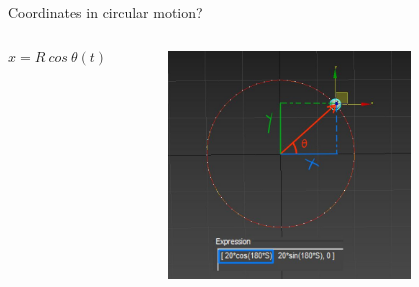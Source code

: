 \documentclass[]{beamer}
\begin{document}
 \begin{frame}

    Coordinates in circular motion?
    
 
        
   
 
           \begin{columns}[c]
             \column{2.3in}  %
  
             \begin{equation*}
                x=R~cos~\theta(t)
            \end{equation*}
 
 
             \column{2.5in}
             
       
             \begin{figure}[h!]  
                 \includegraphics[width=0.8\textwidth]{images/35.jpg}
             
               \end{figure}
               
               
               
                
          
             \end{columns}
 
 
 
      
        \end{frame}
\end{document}
